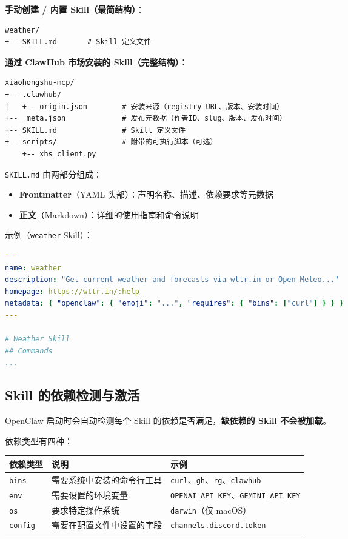 \textbf{手动创建 / 内置 Skill（最简结构）}：

\begin{lstlisting}
weather/
+-- SKILL.md       # Skill 定义文件
\end{lstlisting}

\textbf{通过 ClawHub 市场安装的 Skill（完整结构）}：

\begin{lstlisting}
xiaohongshu-mcp/
+-- .clawhub/
|   +-- origin.json        # 安装来源（registry URL、版本、安装时间）
+-- _meta.json             # 发布元数据（作者ID、slug、版本、发布时间）
+-- SKILL.md               # Skill 定义文件
+-- scripts/               # 附带的可执行脚本（可选）
    +-- xhs_client.py
\end{lstlisting}

\texttt{SKILL.md} 由两部分组成：

\begin{itemize}
  \item \textbf{Frontmatter}（YAML 头部）：声明名称、描述、依赖要求等元数据
  \item \textbf{正文}（Markdown）：详细的使用指南和命令说明
\end{itemize}

示例（\texttt{weather} Skill）：

\begin{lstlisting}[language=yaml]
---
name: weather
description: "Get current weather and forecasts via wttr.in or Open-Meteo..."
homepage: https://wttr.in/:help
metadata: { "openclaw": { "emoji": "...", "requires": { "bins": ["curl"] } } }
---

# Weather Skill
## Commands
...
\end{lstlisting}

\subsection{Skill 的依赖检测与激活}


OpenClaw 启动时会自动检测每个 Skill 的依赖是否满足，\textbf{缺依赖的 Skill 不会被加载}。

依赖类型有四种：

\begin{table}[h]
\centering
\small
\begin{tabular}{|l|l|l|}
\hline
依赖类型 & 说明 & 示例 \\
\hline
\texttt{bins} & 需要系统中安装的命令行工具 & \texttt{curl}、\texttt{gh}、\texttt{rg}、\texttt{clawhub} \\
\hline
\texttt{env} & 需要设置的环境变量 & \texttt{OPENAI\_API\_KEY}、\texttt{GEMINI\_API\_KEY} \\
\hline
\texttt{os} & 要求特定操作系统 & \texttt{darwin}（仅 macOS） \\
\hline
\texttt{config} & 需要在配置文件中设置的字段 & \texttt{channels.discord.token} \\
\hline
\end{tabular}
\end{table}

